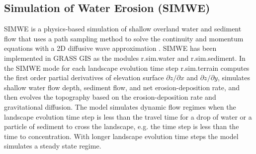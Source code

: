 \documentclass[gmd, manuscript]{copernicus}
\begin{document}
\subsection{Simulation of Water Erosion (SIMWE)} \label{simwe}


SIMWE is a physics-based simulation of shallow overland water and sediment flow
that uses a path sampling method to solve the continuity and momentum equations 
with a 2D diffusive wave approximation 
\citep{Mitas1998,Mitasova2004}.
SIMWE has been implemented in GRASS GIS as the modules 
r.sim.water
and r.sim.sediment. 
In the SIMWE mode for each landscape evolution time step
r.sim.terrain
computes the first order partial derivatives of elevation surface
$\partial z / \partial x$ and $\partial z / \partial y$, 
simulates shallow water flow depth, sediment flow, and net erosion-deposition rate, 
and then evolves the topography based on the erosion-deposition rate
and gravitational diffusion. 
%
The model simulates dynamic flow regimes
when the landscape evolution time step is less than the travel time 
for a drop of water or a particle of sediment to cross the landscape,
e.g. the time step is less than the time to concentration.
With longer landscape evolution time steps the model simulates a steady state regime. 

% 
\end{document}
